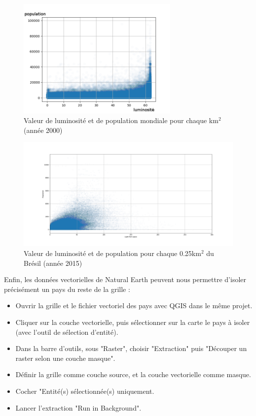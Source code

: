 \documentclass[a4paper, 11pt]{report}
\begin{document}
\begin{figure}
	\centering
	\includegraphics[width=0.7\textwidth]{img/lightpop_scatter.png}
	\caption{Valeur de luminosité et de population mondiale pour chaque km$^2$ (année 2000)}
	\label{lightpop_scatter}
\end{figure}

\begin{figure}
	\centering
	\includegraphics[width=\textwidth]{img/2015_brazil_light_vs_pop.png}
	\caption{Valeur de luminosité et de population pour chaque 0.25km$^2$ du Brésil (année 2015)}
	\label{2015_brazil_light_vs_pop}
\end{figure}

Enfin, les données vectorielles de Natural Earth \cite{naturalearthdata} peuvent nous permettre d'isoler précisément un pays du reste de la grille :
\begin{itemize}
	\item Ouvrir la grille et le fichier vectoriel des pays avec QGIS dans le même projet.
	\item Cliquer sur la couche vectorielle, puis sélectionner sur la carte le pays à isoler (avec l'outil de sélection d'entité).
	\item Dans la barre d'outils, sous "Raster", choisir "Extraction" puis "Découper un raster selon une couche masque".
	\item Définir la grille comme couche source, et la couche vectorielle comme masque.
	\item Cocher "Entité(s) sélectionnée(s) uniquement.
	\item Lancer l'extraction "Run in Background".
\end{itemize}
\end{document}
